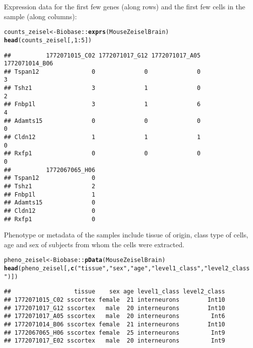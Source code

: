 \documentclass[12pt]{article}\usepackage[]{graphicx}\usepackage[usenames,dvipsnames]{color}
\makeatletter
\newcommand{\hlnum}[1]{\textcolor[rgb]{0.686,0.059,0.569}{#1}}%
\newcommand{\hlstr}[1]{\textcolor[rgb]{0.192,0.494,0.8}{#1}}%
\newcommand{\hlopt}[1]{\textcolor[rgb]{0,0,0}{#1}}%
\newcommand{\hlstd}[1]{\textcolor[rgb]{0.345,0.345,0.345}{#1}}%
\newcommand{\hlkwb}[1]{\textcolor[rgb]{0.69,0.353,0.396}{#1}}%
\newcommand{\hlkwd}[1]{\textcolor[rgb]{0.737,0.353,0.396}{\textbf{#1}}}%
\newenvironment{kframe}{%
 \def\at@end@of@kframe{}%
 \ifinner\ifhmode%
  \def\at@end@of@kframe{\end{minipage}}%
  \begin{minipage}{\columnwidth}%
 \fi\fi%
 \def\FrameCommand##1{\hskip\@totalleftmargin \hskip-\fboxsep
 \colorbox{shadecolor}{##1}\hskip-\fboxsep
     \hskip-\linewidth \hskip-\@totalleftmargin \hskip\columnwidth}%
 \MakeFramed {\advance\hsize-\width
   \@totalleftmargin\z@ \linewidth\hsize
   \@setminipage}}%
 {\par\unskip\endMakeFramed%
 \at@end@of@kframe}
\newenvironment{knitrout}{}{} %
\makeatother
\begin{document}
Expression data for the first few genes (along rows) and the first few
cells in the sample (along columns):

\begin{knitrout}
\color{fgcolor}\begin{kframe}
\begin{alltt}
\hlstd{counts_zeisel} \hlkwb{<-} \hlstd{Biobase}\hlopt{::}\hlkwd{exprs}\hlstd{(MouseZeiselBrain)}
\hlkwd{head}\hlstd{(counts_zeisel[,}\hlnum{1}\hlopt{:}\hlnum{5}\hlstd{])}
\end{alltt}
\begin{verbatim}
##          1772071015_C02 1772071017_G12 1772071017_A05 1772071014_B06
## Tspan12               0              0              0              3
## Tshz1                 3              1              0              2
## Fnbp1l                3              1              6              4
## Adamts15              0              0              0              0
## Cldn12                1              1              1              0
## Rxfp1                 0              0              0              0
##          1772067065_H06
## Tspan12               0
## Tshz1                 2
## Fnbp1l                1
## Adamts15              0
## Cldn12                0
## Rxfp1                 0
\end{verbatim}
\end{kframe}
\end{knitrout}


Phenotype or metadata of the samples include tissue of origin, class type of cells, age and sex of subjects from whom the cells were extracted.

\begin{knitrout}
\color{fgcolor}\begin{kframe}
\begin{alltt}
\hlstd{pheno_zeisel} \hlkwb{<-} \hlstd{Biobase}\hlopt{::}\hlkwd{pData}\hlstd{(MouseZeiselBrain)}
\hlkwd{head}\hlstd{(pheno_zeisel[,}\hlkwd{c}\hlstd{(}\hlstr{"tissue"}\hlstd{,}\hlstr{"sex"}\hlstd{,}\hlstr{"age"}\hlstd{,}\hlstr{"level1_class"}\hlstd{,}\hlstr{"level2_class"}\hlstd{)])}
\end{alltt}
\begin{verbatim}
##                  tissue    sex age level1_class level2_class
## 1772071015_C02 sscortex female  21 interneurons        Int10
## 1772071017_G12 sscortex   male  20 interneurons        Int10
## 1772071017_A05 sscortex   male  20 interneurons         Int6
## 1772071014_B06 sscortex female  21 interneurons        Int10
## 1772067065_H06 sscortex female  25 interneurons         Int9
## 1772071017_E02 sscortex   male  20 interneurons         Int9
\end{verbatim}
\end{kframe}
\end{knitrout}
\end{document}

